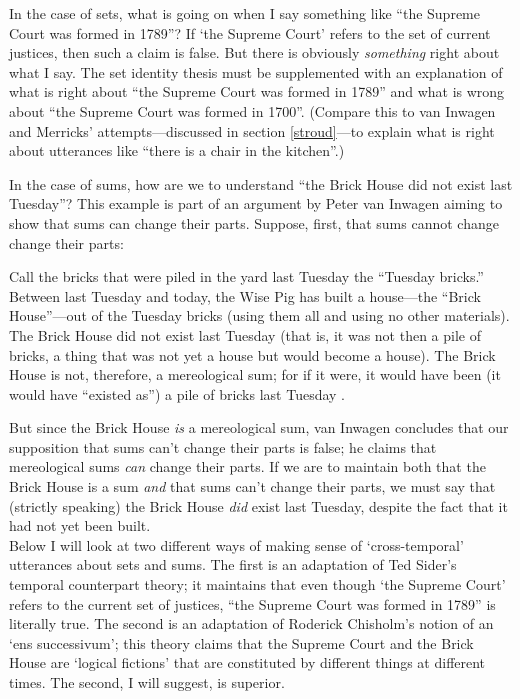 \documentclass[11pt]{article}
\newenvironment{squote}{%
\begin{spacing}{1}
\begin{list}{}{%
\setlength{\labelwidth}{0pt}%
\rightmargin\leftmargin%
}
\item\relax
}{%
\end{list}%
\end{spacing}
}
\begin{document}
\begin{spacing}{1.5}
In the case of sets, what is going on when I say something like ``the
Supreme Court was formed in 1789''?  If `the Supreme Court' refers to
the set of current justices, then such a claim is false.  But there is
obviously {\em something} right about what I say.  The set identity
thesis must be supplemented with an explanation of what is right about
``the Supreme Court was formed in 1789'' and what is wrong about ``the
Supreme Court was formed in 1700''.  (Compare this to van Inwagen and
Merricks' attempts---discussed in section \ref{stroud}---to explain
what is right about utterances like ``there is a chair in the
kitchen''.)

In the case of sums, how are we to understand ``the Brick House did
not exist last Tuesday''?  This example is part of an argument by
Peter van Inwagen aiming to show that sums can change their parts.
Suppose, first, that sums cannot change change their parts:

\begin{squote}
Call the bricks that were piled in the yard last Tuesday the ``Tuesday
bricks.''  Between last Tuesday and today, the Wise Pig has built a
house---the ``Brick House''---out of the Tuesday bricks (using them
all and using no other materials).  The Brick House did not exist last
Tuesday (that is, it was not then a pile of bricks, a thing that was
not yet a house but would become a house).  The Brick House is not,
therefore, a mereological sum; for if it were, it would have been (it
would have ``existed as'') a pile of bricks last Tuesday
\citeyearpar[616]{inwagen2006}.
\end{squote}

But since the Brick House {\em is} a mereological sum, van Inwagen
concludes that our supposition that sums can't change their parts is
false; he claims that mereological sums {\em can} change their parts.
If we are to maintain both that the Brick House is a sum {\em and}
that sums can't change their parts, we must say that (strictly
speaking) the Brick House {\em did} exist last Tuesday, despite the
fact that it had not yet been built. \\

Below I will look at two different ways of making sense of
`cross-temporal' utterances about sets and sums.  The first is an
adaptation of Ted Sider's temporal counterpart theory; it maintains
that even though `the Supreme Court' refers to the current set of
justices, ``the Supreme Court was formed in 1789'' is literally true.
The second is an adaptation of Roderick Chisholm's notion of an `ens
successivum'; this theory claims that the Supreme Court and the Brick
House are `logical fictions' that are constituted by different things
at different times.  The second, I will suggest, is superior.


\end{spacing}
\end{document}
